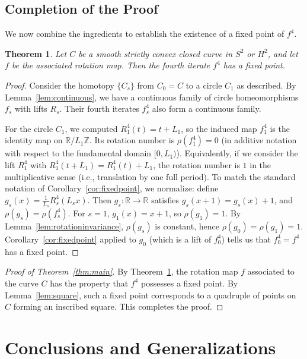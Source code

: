 \documentclass{article}
\newtheorem{theorem}{Theorem}[section]
\begin{document}
\subsection{Completion of the Proof}

We now combine the ingredients to establish the existence of a fixed point of $f^4$.

\begin{theorem}\label{thm:fixedpointR4}
    Let $C$ be a smooth strictly convex closed curve in $S^2$ or $H^2$, and let $f$ be the associated rotation map. Then the fourth iterate $f^4$ has a fixed point.
\end{theorem}
\begin{proof}
    Consider the homotopy $\{C_s\}$ from $C_0 = C$ to a circle $C_1$ as described. By Lemma~\ref{lem:continuous}, we have a continuous family of circle homeomorphisms $f_s$ with lifts $R_s$. Their fourth iterates $f_s^4$ also form a continuous family.

    For the circle $C_1$, we computed $R_1^4(t) = t + L_1$, so the induced map $f_1^4$ is the identity map on $\mathbb{R}/L_1\mathbb{Z}$. Its rotation number is $\rho(f_1^4) = 0$ (in additive notation with respect to the fundamental domain $[0,L_1)$). Equivalently, if we consider the lift $R_1^4$ with $R_1^4(t+L_1)=R_1^4(t)+L_1$, the rotation number is $1$ in the multiplicative sense (i.e., translation by one full period). To match the standard notation of Corollary~\ref{cor:fixedpoint}, we normalize: define $g_s(x) = \frac{1}{L_s} R_s^4(L_s x)$. Then $g_s: \mathbb{R} \to \mathbb{R}$ satisfies $g_s(x+1)=g_s(x)+1$, and $\rho(g_s) = \rho(f_s^4)$. For $s=1$, $g_1(x)=x+1$, so $\rho(g_1)=1$.
   By Lemma~\ref{lem:rotationinvariance}, $\rho(g_s)$ is constant, hence $\rho(g_0) = \rho(g_1) = 1$. Corollary~\ref{cor:fixedpoint} applied to $g_0$ (which is a lift of $f_0^4$) tells us that $f_0^4 = f^4$ has a fixed point.
\end{proof}

\begin{proof}[Proof of Theorem~\ref{thm:main}]
    By Theorem~\ref{thm:fixedpointR4}, the rotation map $f$ associated to the curve $C$ has the property that $f^4$ possesses a fixed point. By Lemma~\ref{lem:square}, such a fixed point corresponds to a quadruple of points on $C$ forming an inscribed square. This completes the proof.
\end{proof}

\section{Conclusions and Generalizations}
\end{document}
